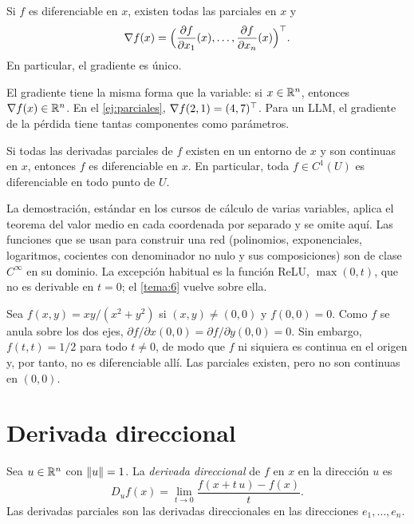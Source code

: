 \begin{proposicion}\label{prop:grad-parciales}
Si $f$ es diferenciable en $x$, existen todas las parciales en $x$ y
\[
\nabla f(x)=\Bigl(\frac{\partial f}{\partial x_1}(x),\dots,\frac{\partial f}{\partial x_n}(x)\Bigr)^{\top}.
\]
En particular, el gradiente es único.
\end{proposicion}

El gradiente tiene la misma forma que la variable: si $x\in\mathbb{R}^{n}$, entonces $\nabla f(x)\in\mathbb{R}^{n}$. En el \cref{ej:parciales}, $\nabla f(2,1)=(4,7)^{\top}$. Para un LLM, el gradiente de la pérdida tiene tantas componentes como parámetros.

\begin{teorema}\label{teo:C1}
Si todas las derivadas parciales de $f$ existen en un entorno de $x$ y son continuas en $x$, entonces $f$ es diferenciable en $x$. En particular, toda $f\in C^{1}(U)$ es diferenciable en todo punto de $U$.
\end{teorema}

La demostración, estándar en los cursos de cálculo de varias variables, aplica el teorema del valor medio en cada coordenada por separado y se omite aquí. Las funciones que se usan para construir una red (polinomios, exponenciales, logaritmos, cocientes con denominador no nulo y sus composiciones) son de clase $C^{\infty}$ en su dominio. La excepción habitual es la función ReLU, $\max(0,t)$, que no es derivable en $t=0$; el \cref{tema:6} vuelve sobre ella.

\begin{observacion}
Sea $f(x,y)=xy/(x^{2}+y^{2})$ si $(x,y)\ne(0,0)$ y $f(0,0)=0$. Como $f$ se anula sobre los dos ejes, $\partial f/\partial x(0,0)=\partial f/\partial y(0,0)=0$. Sin embargo, $f(t,t)=1/2$ para todo $t\ne 0$, de modo que $f$ ni siquiera es continua en el origen y, por tanto, no es diferenciable allí. Las parciales existen, pero no son continuas en $(0,0)$.
\end{observacion}

\section{Derivada direccional}

\begin{definicion}\label{def:direccional}
Sea $u\in\mathbb{R}^{n}$ con $\lVert u\rVert=1$. La \emph{derivada direccional} de $f$ en $x$ en la dirección $u$ es
\[
D_u f(x)=\lim_{t\to 0}\frac{f(x+t\,u)-f(x)}{t}.
\]
Las derivadas parciales son las derivadas direccionales en las direcciones $e_1,\dots,e_n$.
\end{definicion}

